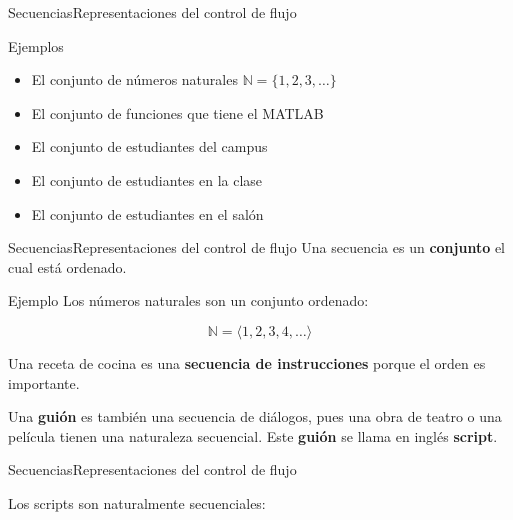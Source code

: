 \documentclass[spanish, c]{beamer}
\begin{document}
\begin{frame}{Secuencias}{Representaciones del control de flujo}
    \begin{exampleblock}{Ejemplos}
        \begin{itemize}[<+->]
            \item El conjunto de números naturales $\mathbb{N} = \{1, 2, 3, \dots\}$
            \item El conjunto de funciones que tiene el MATLAB
            \item El conjunto de estudiantes del campus
            \item El conjunto de estudiantes en la clase
            \item El conjunto de estudiantes en el salón
        \end{itemize}
    \end{exampleblock}
\end{frame}

\begin{frame}{Secuencias}{Representaciones del control de flujo}
    Una \alert{secuencia} es un \textbf{conjunto} el cual está \alert{ordenado}. \pause

    \begin{exampleblock}{Ejemplo}
        Los números naturales son un conjunto ordenado:

        $$\mathbb{N} = \langle 1, 2, 3, 4, \dots \rangle$$
        
    \end{exampleblock} \pause

    Una receta de cocina es una \textbf{secuencia de instrucciones} porque el orden es importante. \pause
    
    Una \textbf{guión} es también una secuencia de diálogos, pues una obra de teatro o una película tienen una naturaleza secuencial.
    Este \textbf{guión} se llama en inglés \textbf{script}.
\end{frame}

\begin{frame}[fragile]{Secuencias}{Representaciones del control de flujo}

    Los \alert{scripts} son naturalmente secuenciales:

    \bigskip

    \begin{columns}
        \begin{column}{0.95\linewidth}
            
        \end{column}
    \end{columns}

\end{frame}
\end{document}
